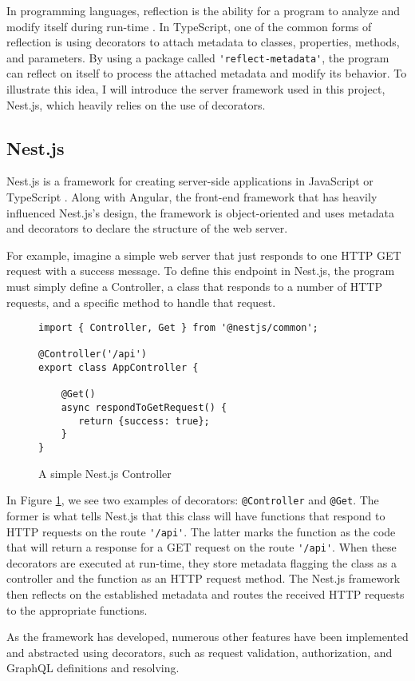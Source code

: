 In programming languages, reflection is the ability for a program to analyze and modify itself during run-time \cite{malenfantTutorialBehavioralReflection1996}.  In TypeScript, one of the common forms of reflection is using decorators to attach metadata to classes, properties, methods, and parameters.  By using a package called \Verb!'reflect-metadata'!, the program can reflect on itself to process the attached metadata and modify its behavior.  To illustrate this idea, I will introduce the server framework used in this project, Nest.js, which heavily relies on the use of decorators.

\subsection{Nest.js} \label{sec:nest-js}
Nest.js is a framework for creating server-side applications in JavaScript or TypeScript \cite{mysliwiecDocumentation2019}.  Along with Angular, the front-end framework that has heavily influenced Nest.js's design, the framework is object-oriented and uses metadata and decorators to declare the structure of the web server.

For example, imagine a simple web server that just responds to one HTTP GET request with a success message.  To define this endpoint in Nest.js, the program must simply define a Controller, a class that responds to a number of HTTP requests, and a specific method to handle that request.

\begin{figure}
    \begin{verbatim}
import { Controller, Get } from '@nestjs/common';

@Controller('/api')
export class AppController {

    @Get()
    async respondToGetRequest() {
       return {success: true};
    }
}
    \end{verbatim}
    \caption{A simple Nest.js Controller}
    \label{fig:nest-controller}
\end{figure}

In Figure \ref{fig:nest-controller}, we see two examples of decorators: \Verb!@Controller! and \Verb!@Get!.  The former is what tells Nest.js that this class will have functions that respond to HTTP requests on the route \Verb!'/api'!.  The latter marks the function as the code that will return a response for a GET request on the route \Verb!'/api'!.  When these decorators are executed at run-time, they store metadata flagging the class as a controller and the function as an HTTP request method.  The Nest.js framework then reflects on the established metadata and routes the received HTTP requests to the appropriate functions.

As the framework has developed, numerous other features have been implemented and abstracted using decorators, such as request validation, authorization, and GraphQL definitions and resolving.